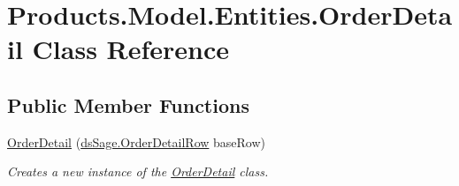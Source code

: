 \hypertarget{class_products_1_1_model_1_1_entities_1_1_order_detail}{}\section{Products.\+Model.\+Entities.\+Order\+Detail Class Reference}
\label{class_products_1_1_model_1_1_entities_1_1_order_detail}
\subsection*{Public Member Functions}
\begin{DoxyCompactItemize}
\item 
\hyperlink{class_products_1_1_model_1_1_entities_1_1_order_detail_afe5b55d3137ec257cb23aa380feb9fdb}{Order\+Detail} (\hyperlink{class_products_1_1_data_1_1ds_sage_1_1_order_detail_row}{ds\+Sage.\+Order\+Detail\+Row} base\+Row)
\begin{DoxyCompactList}\small\item\em Creates a new instance of the \hyperlink{class_products_1_1_model_1_1_entities_1_1_order_detail}{Order\+Detail} class. \end{DoxyCompactList}\end{DoxyCompactItemize}
